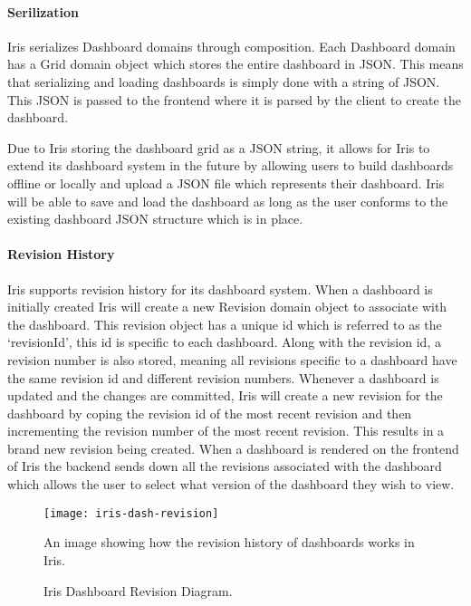 \documentclass[12pt,a4paper,titlepage]{report}
\begin{document}
\paragraph{Serilization}
Iris serializes Dashboard domains through composition. Each Dashboard domain has a Grid domain object which stores the entire dashboard in JSON. This means that serializing and loading dashboards is simply done with a string of JSON. This JSON is passed to the frontend where it is parsed by the client to create the dashboard.

Due to Iris storing the dashboard grid as a JSON string, it allows for Iris to extend its dashboard system in the future by allowing users to build dashboards offline or locally and upload a JSON file which represents their dashboard. Iris will be able to save and load the dashboard as long as the user conforms to the existing dashboard JSON structure which is in place.

\paragraph{Revision History}
Iris supports revision history for its dashboard system. When a dashboard is initially created Iris will create a new Revision domain object to associate with the dashboard. This revision object has a unique id which is referred to as the `revisionId', this id is specific to each dashboard. Along with the revision id, a revision number is also stored, meaning all revisions specific to a dashboard have the same revision id and different revision numbers. Whenever a dashboard is updated and the changes are committed, Iris will create a new revision for the dashboard by coping the revision id of the most recent revision and then incrementing the revision number of the most recent revision. This results in a brand new revision being created. When a dashboard is rendered on the frontend of Iris the backend sends down all the revisions associated with the dashboard which allows the user to select what version of the dashboard they wish to view.

\begin{figure}[H]
\begin{tcolorbox}
\begin{center}
\texttt{[image: iris-dash-revision]}
\end{center}
An image showing how the revision history of dashboards works in Iris.
\end{tcolorbox}
\caption{Iris Dashboard Revision Diagram.}
\end{figure}
\end{document}
